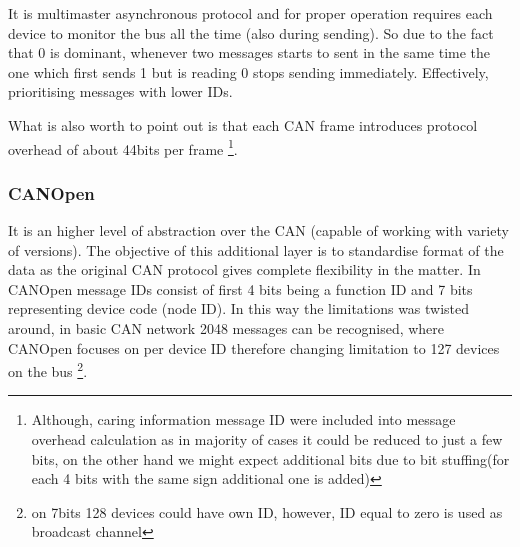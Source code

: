 It is multimaster asynchronous protocol and for proper operation requires each device to monitor the bus all the time (also during sending). So due to the fact that 0 is dominant, whenever two messages starts to sent in the same time the one which first sends 1 but is reading 0 stops sending immediately. Effectively, prioritising messages with lower IDs.

What is also worth to point out is that each CAN frame introduces protocol overhead of about 44bits per frame \footnote{Although, caring information message ID were included into message overhead calculation as in majority of cases it could be reduced to just a few bits, on the other hand we might expect additional bits due to bit stuffing(for each 4 bits with the same sign additional one is added)}.

\subsubsection{CANOpen}
It is an higher level of abstraction over the CAN (capable of working with variety of versions). The objective of this additional layer is to standardise format of the data as the original CAN protocol gives complete flexibility in the matter. 
In CANOpen message IDs consist of first 4 bits being a function ID and 7 bits representing device code (node ID). In this way the limitations was twisted around, in basic CAN network 2048 messages can be recognised, where CANOpen focuses on per device ID therefore changing limitation to 127 devices on the bus \footnote{on 7bits 128 devices could have own ID, however, ID equal to zero is used as broadcast channel}.


